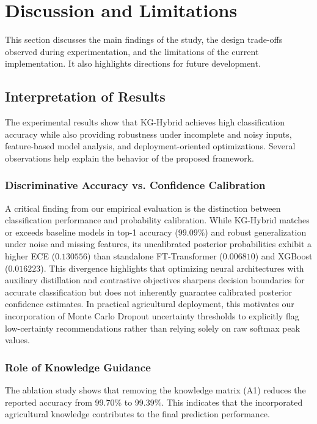 \documentclass[journal]{IEEEtran}
\begin{document}
\section{Discussion and Limitations}

This section discusses the main findings of the study, the design trade-offs observed during experimentation, and the limitations of the current implementation. It also highlights directions for future development.


\subsection{Interpretation of Results}

The experimental results show that KG-Hybrid achieves high classification accuracy while also providing robustness under incomplete and noisy inputs, feature-based model analysis, and deployment-oriented optimizations. Several observations help explain the behavior of the proposed framework.


\subsubsection{Discriminative Accuracy vs. Confidence Calibration}
A critical finding from our empirical evaluation is the distinction between classification performance and probability calibration. While KG-Hybrid matches or exceeds baseline models in top-1 accuracy ($99.09\%$) and robust generalization under noise and missing features, its uncalibrated posterior probabilities exhibit a higher ECE ($0.130556$) than standalone FT-Transformer ($0.006810$) and XGBoost ($0.016223$). This divergence highlights that optimizing neural architectures with auxiliary distillation and contrastive objectives sharpens decision boundaries for accurate classification but does not inherently guarantee calibrated posterior confidence estimates. In practical agricultural deployment, this motivates our incorporation of Monte Carlo Dropout uncertainty thresholds to explicitly flag low-certainty recommendations rather than relying solely on raw softmax peak values.

\subsubsection{Role of Knowledge Guidance}

The ablation study shows that removing the knowledge matrix (A1) reduces the reported accuracy from 99.70\% to 99.39\%. This indicates that the incorporated agricultural knowledge contributes to the final prediction performance.
\end{document}
